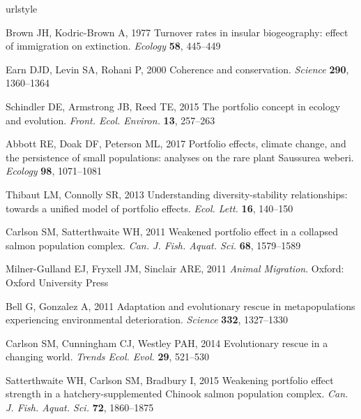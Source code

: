 \documentclass{revtex4}
\begin{document}
\begin{thebibliography}{10}
\expandafter\ifx\csname urlstyle\endcsname\relax
  \providecommand{\doi}[1]{doi:\discretionary{}{}{}#1}\else
  \providecommand{\doi}{doi:\discretionary{}{}{}\begingroup
  \urlstyle{rm}\Url}\fi

Brown JH, Kodric-Brown A, 1977 {Turnover rates in insular biogeography: effect
  of immigration on extinction}.
\newblock \emph{Ecology} \textbf{58}, 445--449

Earn DJD, Levin SA, Rohani P, 2000 {Coherence and conservation}.
\newblock \emph{Science} \textbf{290}, 1360--1364

Schindler DE, Armstrong JB, Reed TE, 2015 {The portfolio concept in ecology and
  evolution}.
\newblock \emph{Front. Ecol. Environ.} \textbf{13}, 257--263

Abbott RE, Doak DF, Peterson ML, 2017 {Portfolio effects, climate change, and
  the persistence of small populations: analyses on the rare plant Saussurea
  weberi.}
\newblock \emph{Ecology} \textbf{98}, 1071--1081

Thibaut LM, Connolly SR, 2013 {Understanding diversity-stability relationships:
  towards a unified model of portfolio effects.}
\newblock \emph{Ecol. Lett.} \textbf{16}, 140--150

Carlson SM, Satterthwaite WH, 2011 {Weakened portfolio effect in a collapsed
  salmon population complex}.
\newblock \emph{Can. J. Fish. Aquat. Sci.} \textbf{68}, 1579--1589

Milner-Gulland EJ, Fryxell JM, Sinclair ARE, 2011 \emph{{Animal Migration}}.
\newblock Oxford: Oxford University Press

Bell G, Gonzalez A, 2011 {Adaptation and evolutionary rescue in metapopulations
  experiencing environmental deterioration}.
\newblock \emph{Science} \textbf{332}, 1327--1330

Carlson SM, Cunningham CJ, Westley PAH, 2014 {Evolutionary rescue in a changing
  world}.
\newblock \emph{Trends Ecol. Evol.} \textbf{29}, 521--530

Satterthwaite WH, Carlson SM, Bradbury I, 2015 {Weakening portfolio effect
  strength in a hatchery-supplemented Chinook salmon population complex}.
\newblock \emph{Can. J. Fish. Aquat. Sci.} \textbf{72}, 1860--1875


\end{thebibliography}
\end{document}
